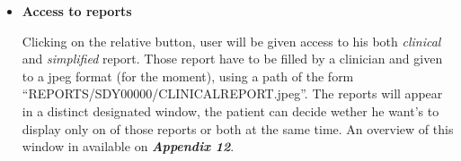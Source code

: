 \begin{itemize}
	\item \textbf{Access to reports}
	
	\newline \vspace{3mm}
	
	Clicking on the relative button, user will be given access to his both \textit{clinical} and \textit{simplified} report. Those report have to be filled by a clinician and given to a jpeg format (for the moment), using a path of the form ``REPORTS/SDY00000/CLINICALREPORT.jpeg''. The reports will appear in a distinct designated window, the patient can decide wether he want's to display only on of those reports or both at the same time. An overview of this window in available on \textbf{\textit{Appendix 12}}.

 
\end{itemize}


